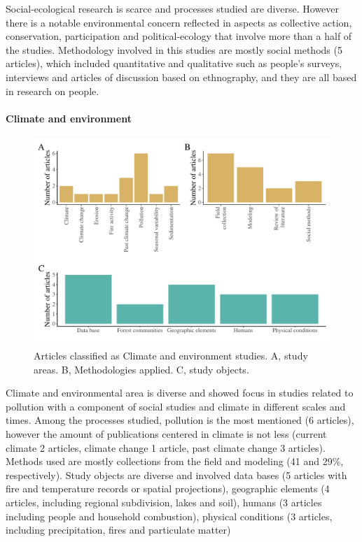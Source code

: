 \documentclass[]{article}
\let\oldparagraph\paragraph
\renewcommand{\paragraph}[1]{\oldparagraph{#1}\mbox{}}
\begin{document}
Social-ecological research is scarce and processes studied are diverse. However there is a notable environmental concern reflected in aspects as collective action, conservation, participation and political-ecology that involve more than a half of the studies. Methodology involved in this studies are mostly social methods (5 articles), which included quantitative and qualitative such as people's surveys, interviews and articles of discussion based on ethnography, and they are all based in research on people.

\hypertarget{climate-and-environment}{%
\paragraph{Climate and environment}\label{climate-and-environment}}

\begin{figure}
\centering
\includegraphics{Review_and_climate_files/figure-latex/Climate-1.pdf}
\caption{\label{fig:Climate}Articles classified as Climate and environment studies. A, study areas. B, Methodologies applied. C, study objects.}
\end{figure}

Climate and environmental area is diverse and showed focus in studies related to pollution with a component of social studies and climate in different scales and times. Among the processes studied, pollution is the most mentioned (6 articles), however the amount of publications centered in climate is not less (current climate 2 articles, climate change 1 article, past climate change 3 articles). Methods used are mostly collections from the field and modeling (41 and 29\%, respectively). Study objects are diverse and involved data bases (5 articles with fire and temperature records or spatial projections), geographic elements (4 articles, including regional subdivision, lakes and soil), humans (3 articles including people and household combustion), physical conditions (3 articles, including precipitation, fires and particulate matter)
\end{document}
